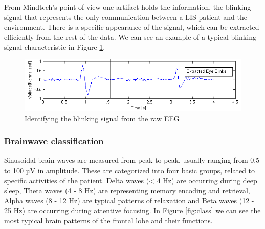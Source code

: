 \documentclass[letterpaper,10pt]{article}
\begin{document}
From Mindtech's point of view one artifact holds the information, the blinking signal that represents the only communication between a LIS patient and the environment. There is a specific appearance of the signal, which can be extracted efficiently from the rest of the data. We can see an example of a typical blinking signal characteristic in Figure \ref{fig:blink}.

\begin{figure}[h]
\centering
\includegraphics[scale=0.7]{blink.png}
\caption[Identifying the blinking signal from the raw EEG]{Identifying the blinking signal from the raw EEG \cite{matiko_beeby_tudor_2013}}
\label{fig:blink}
\end{figure}

\subsubsection{Brainwave classification}

Sinusoidal brain waves are measured from peak to peak, usually ranging from 0.5 to 100 µV in amplitude. These are categorized into four basic groups, related to specific activities of the patient. Delta waves (< 4 Hz) are occurring during deep sleep, Theta waves (4 - 8 Hz) are representing memory encoding and retrieval, Alpha waves (8 - 12 Hz) are typical patterns of relaxation and Beta waves (12 - 25 Hz) are occurring during attentive focusing. In Figure \ref{fig:class} we can see the most typical brain patterns of the frontal lobe and their functions.
\end{document}

